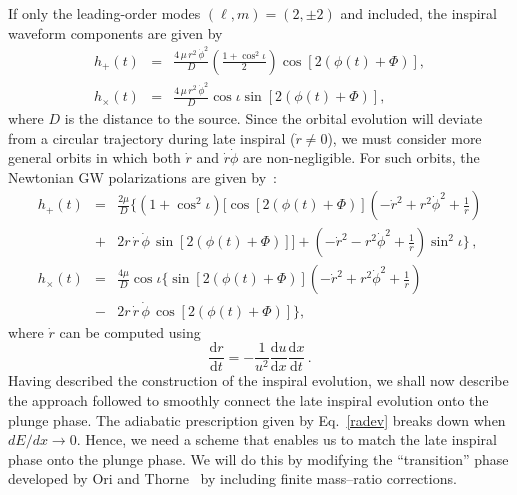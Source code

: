 \documentclass[aps,prd,showpacs,amssymb,floatfix,nofootinbib,superscriptaddress]{revtex4-1}%
\begin{document}
\noindent If only the leading-order modes \((\ell,m)=(2, \pm 2)\) and included, the inspiral waveform components  are given by 
\begin{eqnarray}
h_{+}(t)&=& \frac{4\, \mu\,  r^2\, \dot{\phi}^2 }{D}\left(\frac{1+\cos^2 \iota}{2}\right)\cos\left[2(\phi(t) + \Phi)\right],\label{inspp}\\
h_{\times}(t)&=& \frac{4\, \mu\, r^2\, \dot{\phi}^2}{D} \cos\iota \sin\left[2(\phi(t) + \Phi)\right],
\label{inspc}
\end{eqnarray}
\noindent where \(D\) is the distance to the source. Since the orbital evolution will deviate from a circular trajectory during late inspiral (\(\dot{r}\neq0\)), we must consider more general orbits in which both \(\dot{r}\) and \(\dot{r}\dot{\phi}\) are non-negligible. For such orbits, the Newtonian GW polarizations are given by~\cite{Gopakumar:2002}:
\begin{eqnarray}
\label{insppcor}
h_{+}(t)&=& \frac{2 \mu }{D}\Bigg\{ \left(1+\cos^2 \iota\right) \Bigg[ \cos\left[2(\phi(t) + \Phi)\right]\left(-\dot{r}^2 + r^2 \dot{\phi}^2 + \frac{1}{r}\right) \nonumber \\ &+& 2r\,\dot{r}\,\dot{\phi}\,\sin\left[2(\phi(t) + \Phi)\right]\Bigg] + \left(-\dot{r}^2 - r^2\dot{\phi}^2 + \frac{1}{r}\right)\sin^2 \iota\Bigg\}\,,\\
\label{inspccorrected}
h_{\times}(t)&=&\frac{4 \mu }{D}\cos\iota\Bigg\{  \sin\left[2(\phi(t) + \Phi)\right]\left(-\dot{r}^2 + r^2 \dot{\phi}^2 + \frac{1}{r}\right) \nonumber \\ &-& 2r\,\dot{r}\,\dot{\phi}\,\cos\left[2(\phi(t) + \Phi)\right]\Bigg\},
\end{eqnarray}
\noindent where \(\dot{r}\) can be computed using
\begin{displaymath}
\frac{{\mathrm{d}}r}{{\mathrm{d}}t} = -\frac{1}{u^2}\frac{{\mathrm{d}u}}{{\mathrm{d}}x}\frac{{\mathrm{d}x}}{{\mathrm{d}}t}\, .
\end{displaymath}
Having described the construction of the inspiral evolution, we shall now describe the approach followed to smoothly connect the late inspiral evolution onto the plunge phase. The adiabatic prescription given by Eq.~\eqref{radev} breaks down when \(dE/dx\rightarrow 0\). Hence, we need a scheme that enables us to match the late inspiral phase onto the plunge phase. We will do this by modifying the ``transition'' phase developed by Ori and Thorne~\cite{amos} by including finite mass--ratio corrections. 
\end{document}
